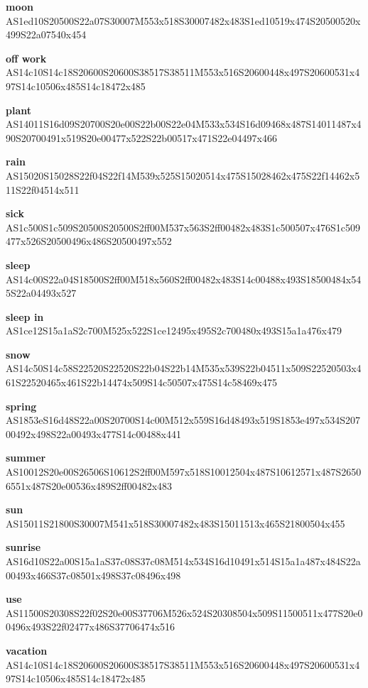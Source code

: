 \documentclass{article}
\begin{document}
\begin{glossary}
\textbf{moon}\\
AS1ed10S20500S22a07S30007M553x518S30007482x483S1ed10519x474S20500520x499S22a07540x454

\textbf{off work}\\
AS14c10S14c18S20600S20600S38517S38511M553x516S20600448x497S20600531x497S14c10506x485S14c18472x485

\textbf{plant}\\
AS14011S16d09S20700S20e00S22b00S22e04M533x534S16d09468x487S14011487x490S20700491x519S20e00477x522S22b00517x471S22e04497x466

\textbf{rain}\\
AS15020S15028S22f04S22f14M539x525S15020514x475S15028462x475S22f14462x511S22f04514x511

\textbf{sick}\\
AS1c500S1c509S20500S20500S2ff00M537x563S2ff00482x483S1c500507x476S1c509477x526S20500496x486S20500497x552

\textbf{sleep}\\
AS14c00S22a04S18500S2ff00M518x560S2ff00482x483S14c00488x493S18500484x545S22a04493x527

\textbf{sleep in}\\
AS1ce12S15a1aS2c700M525x522S1ce12495x495S2c700480x493S15a1a476x479

\textbf{snow}\\
AS14c50S14c58S22520S22520S22b04S22b14M535x539S22b04511x509S22520503x461S22520465x461S22b14474x509S14c50507x475S14c58469x475

\textbf{spring}\\
AS1853eS16d48S22a00S20700S14c00M512x559S16d48493x519S1853e497x534S20700492x498S22a00493x477S14c00488x441

\textbf{summer}\\
AS10012S20e00S26506S10612S2ff00M597x518S10012504x487S10612571x487S26506551x487S20e00536x489S2ff00482x483

\textbf{sun}\\
AS15011S21800S30007M541x518S30007482x483S15011513x465S21800504x455

\textbf{sunrise}\\
AS16d10S22a00S15a1aS37c08S37c08M514x534S16d10491x514S15a1a487x484S22a00493x466S37c08501x498S37c08496x498

\textbf{use}\\
AS11500S20308S22f02S20e00S37706M526x524S20308504x509S11500511x477S20e00496x493S22f02477x486S37706474x516

\textbf{vacation}\\
AS14c10S14c18S20600S20600S38517S38511M553x516S20600448x497S20600531x497S14c10506x485S14c18472x485


\end{glossary}
\end{document}
